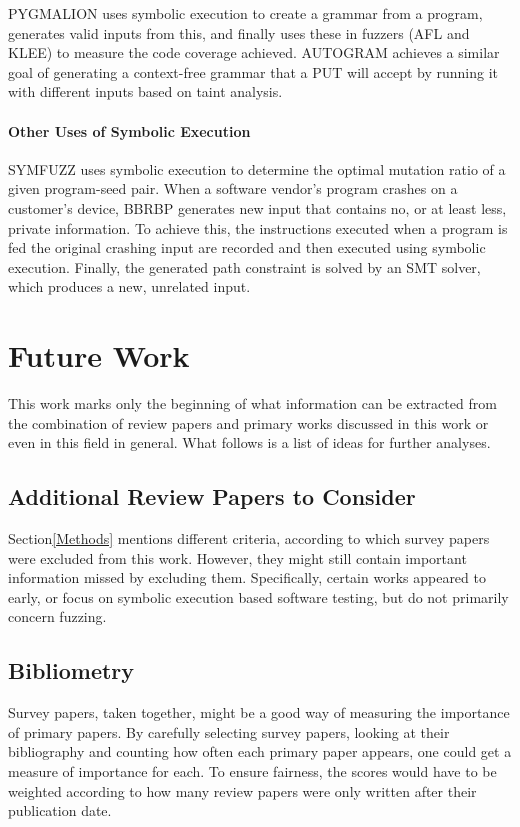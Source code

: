 \documentclass{article}
\begin{document}
\begin{multicols}{2}
    PYGMALION\cite{PYGMALION} uses symbolic execution to create a grammar from a program, generates valid inputs from this, and finally uses these in fuzzers (AFL\cite{AFLPlusPlus} and KLEE\cite{KLEE}) to measure the code coverage achieved. AUTOGRAM\cite{AUTOGRAM} achieves a similar goal of generating a context-free grammar that a PUT will accept by running it with different inputs based on taint analysis.

    \paragraph{Other Uses of Symbolic Execution} SYMFUZZ\cite{SYMFUZZ} uses symbolic execution to determine the optimal mutation ratio of a given program-seed pair. When a software vendor's program crashes on a customer's device, BBRBP\cite{BBRBP} generates new input that contains no, or at least less, private information. To achieve this, the instructions executed when a program is fed the original crashing input are recorded and then executed using symbolic execution. Finally, the generated path constraint is solved by an SMT solver, which produces a new, unrelated input.

    \section{Future Work}
    \label{FutureWork}
    This work marks only the beginning of what information can be extracted from the combination of review papers and primary works discussed in this work or even in this field in general. What follows is a list of ideas for further analyses.

    \subsection{Additional Review Papers to Consider}
    Section\ref{Methods} mentions different criteria, according to which survey papers were excluded from this work. However, they might still contain important information missed by excluding them. Specifically, certain works appeared to early\cite{AutomaticTestDataGeneration, BruteForceVulnDiscovery,BreakingSoftware}, or focus on symbolic execution based software testing, but do not primarily concern fuzzing\cite{DSETestGeneration, SurveySymbex, SearchStrategies, NewTrendsSymbex, ReviewConcolicTesting}.

    \subsection{Bibliometry}
    Survey papers, taken together, might be a good way of measuring the importance of primary papers. By carefully selecting survey papers, looking at their bibliography and counting how often each primary paper appears, one could get a measure of importance for each. To ensure fairness, the scores would have to be weighted according to how many review papers were only written after their publication date.


\end{multicols}
\end{document}
